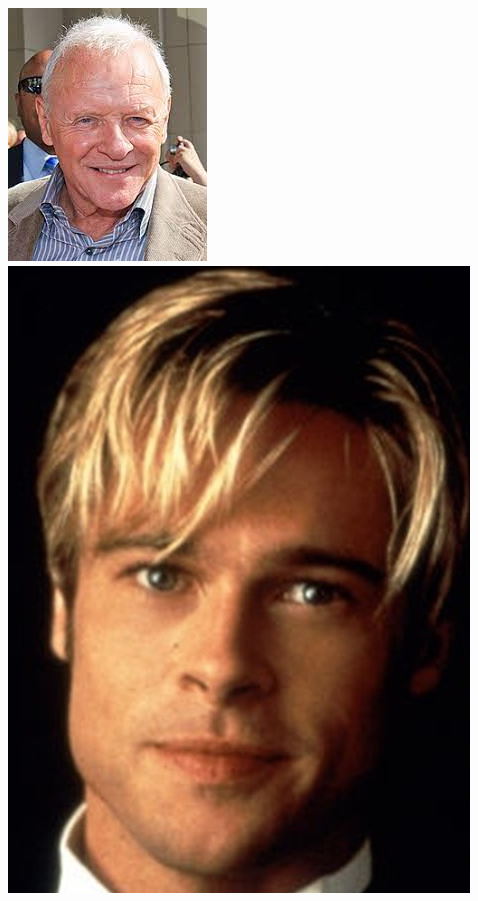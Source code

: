 \documentclass{article}
\begin{document}
\begin{center}
\begin{multicols}{3}
\includegraphics[scale=0.5]{images/Anhony_Hopkins.jpg}
\includegraphics[scale=0.42]{images/Brad_Pitt.jpg}

\end{multicols}
\end{center}
\end{document}
